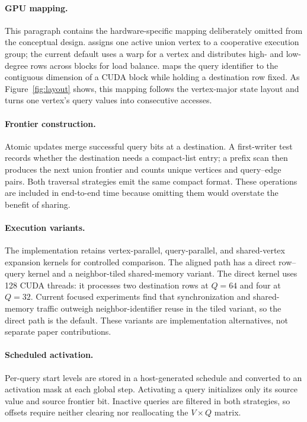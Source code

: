 \paragraph{GPU mapping.}
This paragraph contains the hardware-specific mapping deliberately omitted from the conceptual design.  \sharedexpand assigns one active union vertex to a cooperative execution group; the current default uses a warp for a vertex and distributes high- and low-degree rows across blocks for load balance.  \coalescedgather maps the query identifier to the contiguous dimension of a CUDA block while holding a destination row fixed.  As Figure~\ref{fig:layout} shows, this mapping follows the vertex-major state layout and turns one vertex's query values into consecutive accesses.



\paragraph{Frontier construction.}
Atomic updates merge successful query bits at a destination.  A first-writer test records whether the destination needs a compact-list entry; a prefix scan then produces the next union frontier and counts unique vertices and query--edge pairs.  Both traversal strategies emit the same compact format.  These operations are included in end-to-end time because omitting them would overstate the benefit of sharing.

\paragraph{Execution variants.}
The implementation retains vertex-parallel, query-parallel, and shared-vertex expansion kernels for controlled comparison.  The aligned path has a direct row--query kernel and a neighbor-tiled shared-memory variant.  The direct kernel uses 128 CUDA threads: it processes two destination rows at $Q=64$ and four at $Q=32$.  Current focused experiments find that synchronization and shared-memory traffic outweigh neighbor-identifier reuse in the tiled variant, so the direct path is the default.  These variants are implementation alternatives, not separate paper contributions.

\paragraph{Scheduled activation.}
Per-query start levels are stored in a host-generated schedule and converted to an activation mask at each global step.  Activating a query initializes only its source value and source frontier bit.  Inactive queries are filtered in both strategies, so offsets require neither clearing nor reallocating the $V\!\times\!Q$ matrix.

